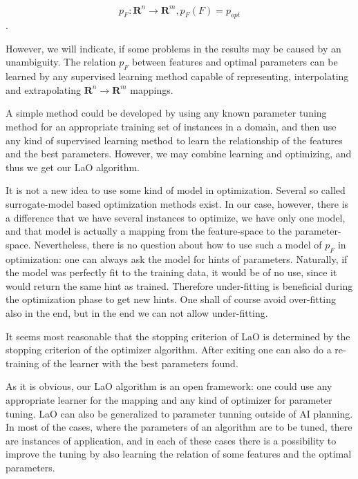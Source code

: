 \documentclass{acm_proc_article-sp}
\begin{document}
\begin{equation} p_F: \mathbf{R}^n \to \mathbf{R}^m, p_F(F)=p_{opt} \end{equation}.	

However, we will indicate, if some problems in the results may be caused by an unambiguity. The relation \begin{math} p_F \end{math} between features and optimal parameters can be learned by any supervised learning method capable of representing, interpolating and extrapolating  \begin{math}\mathbf{R}^n\to \mathbf{R}^m \end{math} mappings. 

A simple method could be developed by using any known parameter tuning method for an appropriate training set of instances in a domain, and then use any kind of supervised learning method to learn the relationship of the features and the best parameters. However, we may combine learning and optimizing, and thus we get our LaO algorithm.

It is not a new idea to use some kind of model in optimization. Several so called surrogate-model based optimization methods exist. In our case, however, there is a difference that we have several instances to optimize, we have only one model, and that model is actually a mapping from the feature-space to the parameter-space. Nevertheless, there is no question about how to use such a model of \begin{math}p_F\end{math} in optimization: one can always ask the model for hints of parameters. Naturally, if the model was perfectly fit to the training data, it would be of no use, since it would return the same hint as trained. Therefore under-fitting is beneficial during the optimization phase to get new hints. One shall of course avoid over-fitting also in the end, but in the end we can not allow under-fitting.

It seems most reasonable that the stopping criterion of LaO is determined by the stopping criterion of the optimizer algorithm. After exiting one can also do a re-training of the learner with the best parameters found.

As it is obvious, our LaO algorithm is an open framework: one could use any appropriate learner for the mapping and any kind of optimizer for parameter tuning. LaO can also be generalized to parameter tunning outside of AI planning. In most of the cases, where the parameters of an algorithm are to be tuned, there are instances of application, and in each of these cases there is a possibility to improve the tuning by also learning the relation of some features and the optimal parameters.
\end{document}
